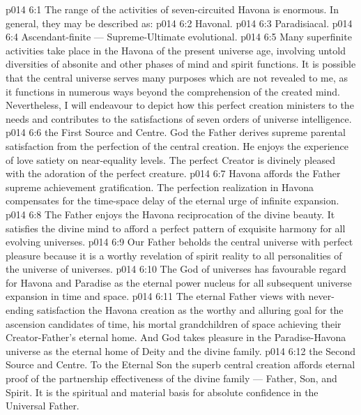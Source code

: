 \vs p014 6:1 The range of the activities of seven\hyp{}circuited Havona is enormous. In general, they may be described as:
\vs p014 6:2 \bibnobreakspace Havonal.
\vs p014 6:3 \bibnobreakspace Paradisiacal.
\vs p014 6:4 \bibnobreakspace Ascendant\hyp{}finite --- Supreme\hyp{}Ultimate evolutional.
\vs p014 6:5 \pc Many superfinite activities take place in the Havona of the present universe age, involving untold diversities of absonite and other phases of mind and spirit functions. It is possible that the central universe serves many purposes which are not revealed to me, as it functions in numerous ways beyond the comprehension of the created mind. Nevertheless, I will endeavour to depict how this perfect creation ministers to the needs and contributes to the satisfactions of seven orders of universe intelligence.
\vs p014 6:6 \bibnobreakspace {} the First Source and Centre. God the Father derives supreme parental satisfaction from the perfection of the central creation. He enjoys the experience of love satiety on near\hyp{}equality levels. The perfect Creator is divinely pleased with the adoration of the perfect creature.
\vs p014 6:7 Havona affords the Father supreme achievement gratification. The perfection realization in Havona compensates for the time\hyp{}space delay of the eternal urge of infinite expansion.
\vs p014 6:8 The Father enjoys the Havona reciprocation of the divine beauty. It satisfies the divine mind to afford a perfect pattern of exquisite harmony for all evolving universes.
\vs p014 6:9 Our Father beholds the central universe with perfect pleasure because it is a worthy revelation of spirit reality to all personalities of the universe of universes.
\vs p014 6:10 The God of universes has favourable regard for Havona and Paradise as the eternal power nucleus for all subsequent universe expansion in time and space.
\vs p014 6:11 The eternal Father views with never\hyp{}ending satisfaction the Havona creation as the worthy and alluring goal for the ascension candidates of time, his mortal grandchildren of space achieving their Creator\hyp{}Father’s eternal home. And God takes pleasure in the Paradise\hyp{}Havona universe as the eternal home of Deity and the divine family.
\vs p014 6:12 \bibnobreakspace {} the Second Source and Centre. To the Eternal Son the superb central creation affords eternal proof of the partnership effectiveness of the divine family --- Father, Son, and Spirit. It is the spiritual and material basis for absolute confidence in the Universal Father.
